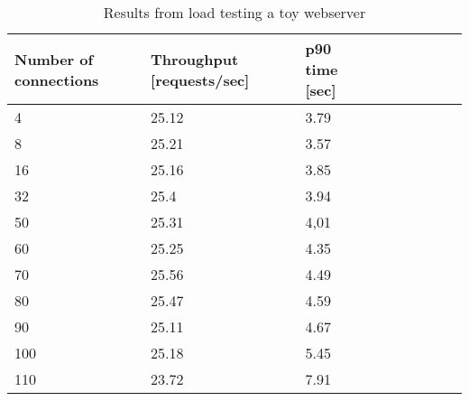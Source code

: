 %
\begin{table}[h]
\footnotesize
\centering
{\renewcommand{\arraystretch}{1.3}
\begin{tabular}{lllllllll}
    \toprule
    Number of connections & Throughput [requests/sec] & p90 time [sec] \\
    \midrule
    4 & 25.12 & 3.79 \\
    8 & 25.21 & 3.57 \\
    16 & 25.16 & 3.85 \\
    32 & 25.4 & 3.94 \\
    50 & 25.31 & 4,01 \\
    60 & 25.25 & 4.35 \\
    70 & 25.56 & 4.49 \\
    80 & 25.47 & 4.59 \\
    90 & 25.11 & 4.67 \\
    100 & 25.18 & 5.45 \\
    110 & 23.72 & 7.91 \\
    \bottomrule
\end{tabular}}
\caption{Results from load testing a toy webserver}
\label{tab:webserver}
\end{table}
